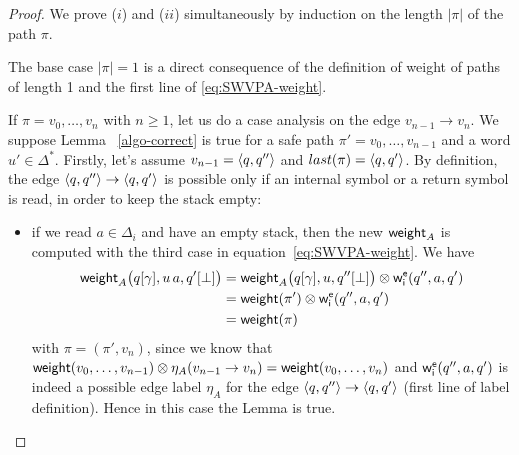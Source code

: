 \begin{proof}
We prove ($i$) and ($ii$) simultaneously by induction on the length $|\pi|$ of the path $\pi$.

\noindent
The base case $|\pi| = 1$ is a direct consequence of the definition of weight of paths of length 1
and the first line of \eqref{eq:SWVPA-weight}.

\noindent
If $\pi = v_0,\ldots, v_n$ with $n \geq 1$, 
let us do a case analysis on the edge $v_{n-1} \to v_n$.
%
We suppose Lemma ~\ref{algo-correct} is true for a safe path $\pi' = v_0,\ldots, v_{n-1}$ and a word $u' \in \Delta^*$. Firstly, let's assume $v_{n-1} = \< q, q''>$ and $last(\pi) = \< q, q'>$. By definition, the edge $\< q, q''> \to \< q, q'>$ is possible only if an internal symbol or a return symbol is read, in order to keep the stack empty:

\begin{itemize}
\item if we read $a \in \Delta_i$ and have an empty stack, then the new $\mathsf{weight}_A$ is computed with the third case in equation~\eqref{eq:SWVPA-weight}.
We have
\begin{align*}
 \weight_A\bigl(\config{q}{\gamma}, u\, a,
               \config{q'}{\bot}\bigr) &=
   \weight_A\bigl(\config{q}{\gamma}, u, \config{q''}{\bot}\bigr)
   \otimes\weiei(q'', a, q')  \\
 &= \weight(\pi')\otimes\weiei(q'', a, q')\\
 &= \weight(\pi)\nonumber 
\end{align*}
with $\pi = (\pi', v_n)$, since we know that $\mathsf{weight}(v_0,\ldots, v_{n-1}) \otimes \eta_A(v_{n-1} \to v_{n}) = \mathsf{weight}(v_0,\ldots, v_n)$ and $\weiei(q'', a, q')$ is indeed a possible edge label $\eta_A$ for the edge $\< q, q''> \to \< q, q'>$ (first line of label definition). Hence in this case the Lemma is true. 


\end{itemize}
\end{proof}
